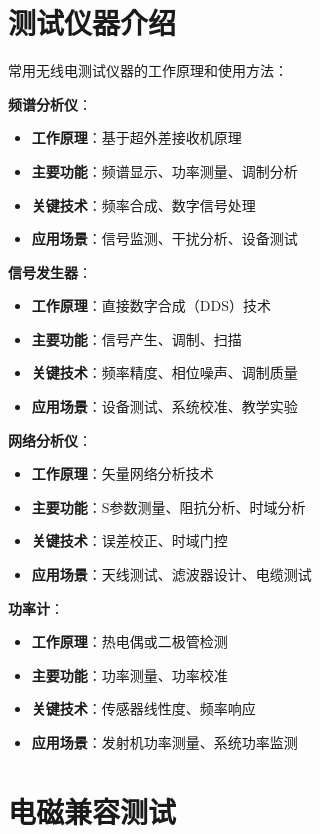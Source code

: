 \documentclass[12pt,UTF8]{ctexbook}
\begin{document}
\section{测试仪器介绍}

常用无线电测试仪器的工作原理和使用方法：

\textbf{频谱分析仪}：
\begin{itemize}[leftmargin=3.5em]
    \item \textbf{工作原理}：基于超外差接收机原理
    \item \textbf{主要功能}：频谱显示、功率测量、调制分析
    \item \textbf{关键技术}：频率合成、数字信号处理
    \item \textbf{应用场景}：信号监测、干扰分析、设备测试
\end{itemize}

\textbf{信号发生器}：
\begin{itemize}[leftmargin=3.5em]
    \item \textbf{工作原理}：直接数字合成（DDS）技术
    \item \textbf{主要功能}：信号产生、调制、扫描
    \item \textbf{关键技术}：频率精度、相位噪声、调制质量
    \item \textbf{应用场景}：设备测试、系统校准、教学实验
\end{itemize}

\textbf{网络分析仪}：
\begin{itemize}[leftmargin=3.5em]
    \item \textbf{工作原理}：矢量网络分析技术
    \item \textbf{主要功能}：S参数测量、阻抗分析、时域分析
    \item \textbf{关键技术}：误差校正、时域门控
    \item \textbf{应用场景}：天线测试、滤波器设计、电缆测试
\end{itemize}

\textbf{功率计}：
\begin{itemize}[leftmargin=3.5em]
    \item \textbf{工作原理}：热电偶或二极管检测
    \item \textbf{主要功能}：功率测量、功率校准
    \item \textbf{关键技术}：传感器线性度、频率响应
    \item \textbf{应用场景}：发射机功率测量、系统功率监测
\end{itemize}

\section{电磁兼容测试}
\end{document}
